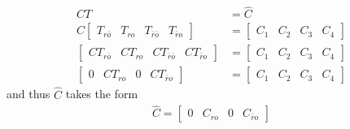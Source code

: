 \documentclass[twoside]{article}
\begin{document}
\begin{align*}
    C T &= \hat{C} 
    \\
    C \left[ \begin{array}{c|c|c|c} T_{r\bar{o}} & T_{ro} & T_{\bar{r} \bar{o}} & T_{\bar{r} o} \end{array} \right] &= 
    \left[ \begin{array}{c|c|c|c} C_1 & C_2 & C_3 & C_4 \end{array} \right]
    \\
    \left[ \begin{array}{c|c|c|c} C T_{r\bar{o}} & C T_{ro} & C T_{\bar{r} \bar{o}} & C T_{\bar{r} o} \end{array} \right] &= 
    \left[ \begin{array}{c|c|c|c} C_1 & C_2 & C_3 & C_4 \end{array} \right]
    \\
    \left[ \begin{array}{c|c|c|c} 0 & C T_{ro} & 0 & C T_{\bar{r} o} \end{array} \right] &= 
    \left[ \begin{array}{c|c|c|c} C_1 & C_2 & C_3 & C_4 \end{array} \right]
\end{align*}
%
and thus $\hat{C}$ takes the form
\begin{align*}
    \hat{C} = \left[ \begin{array}{c|c|c|c} 0 & C_{ro} & 0 & C_{\bar{r}o} \end{array} \right]
\end{align*}
\end{document}
